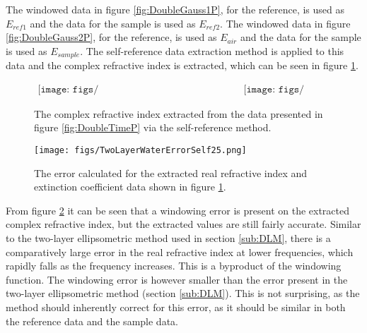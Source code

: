 The windowed data in figure \ref{fig:DoubleGauss1P}, for the reference, is used as $E_{ref1}$ and the data for the sample is used as $E_{ref2}$.
The windowed data in figure \ref{fig:DoubleGauss2P}, for the reference, is used as $E_{air}$ and the data for the sample is used as $E_{sample}$.
The self-reference data extraction method is applied to this data and the complex refractive index is extracted, which can be seen in figure \ref{fig:DoubleExtSelf}.

\begin{figure}[H]
                \begin{center}$
								\begin{array}{cc}
                \texttt{[image: figs/TwoLayerWaterRefractiveIndexSelf25.png]}&
                \texttt{[image: figs/TwoLayerWaterExtinctionSelf25.png]}
								\end{array}$
								\end{center}
	\caption[Complex refractive index extracted from example of a single layer isotropic medium deposited on a bulk isotropic sample, via the self-reference method]{The complex refractive index extracted from the data presented in figure \ref{fig:DoubleTimeP} via the self-reference method.}
	\label{fig:DoubleExtSelf}
\end{figure}

\begin{figure}[H]
\begin{center}
	 \texttt{[image: figs/TwoLayerWaterErrorSelf25.png]}
	 \caption[Two layer self-reference error]{The error calculated for the extracted real refractive index and extinction coefficient data shown in figure \ref{fig:DoubleExtSelf}.}
   \label{fig:DoubleExtSelfEr}
\end{center}
\end{figure}

From figure \ref{fig:DoubleExtSelfEr} it can be seen that a windowing error is present on the extracted complex refractive index, but the extracted values are still fairly accurate. Similar to the two-layer ellipsometric method used in section \ref{sub:DLM}, there is a comparatively large error in the real refractive index at lower frequencies, which rapidly falls as the frequency increases. This is a byproduct of the windowing function. The windowing error is however smaller than the error present in the two-layer ellipsometric method (section \ref{sub:DLM}). This is not surprising, as the method should inherently correct for this error, as it should be similar in both the reference data and the sample data. 

